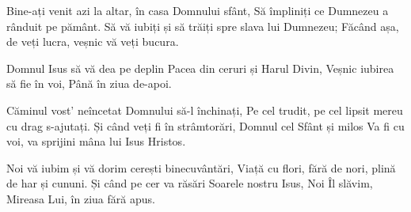 \beginverse
Bine-ați venit azi la altar, în casa Domnului sfânt,
Să împliniți ce Dumnezeu a rânduit pe pământ.
Să vă iubiți și să trăiți spre slava lui Dumnezeu;
Făcând așa, de veți lucra, veșnic vă veți bucura.
\endverse

\beginchorus
Domnul Isus să vă dea pe deplin
Pacea din ceruri și Harul Divin,
Veșnic iubirea să fie în voi,
Până în ziua de-apoi.
\endchorus

\beginverse
Căminul vost’ neîncetat Domnului să-l închinați,
Pe cel trudit, pe cel lipsit mereu cu drag s-ajutați.
Și când veți fi în strâmtorări, Domnul cel Sfânt și milos
Va fi cu voi, va sprijini mâna lui Isus Hristos.
\endverse

\beginverse
Noi vă iubim și vă dorim cerești binecuvântări,
Viață cu flori, fără de nori, plină de har și cununi.
Și când pe cer va răsări Soarele nostru Isus,
Noi Îl slăvim, Mireasa Lui, în ziua fără apus.
\endverse
\endsong